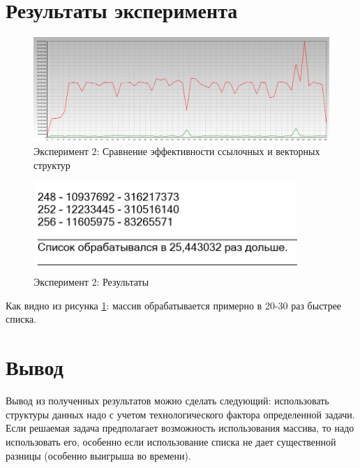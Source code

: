 \section{Результаты эксперимента}
\begin{figure}[ht!]
    \centering
    \includegraphics[width=170mm]{./img/task_02.png}
    \caption{Эксперимент 2: Сравнение эффективности ссылочных и векторных структур}
\end{figure}

\begin{figure}[ht!]
    \centering
    \includegraphics[width=100mm]{./img/res_02.png}
    \caption{Эксперимент 2: Результаты\label{res_02}}
\end{figure}

Как видно из рисунка \ref{res_02}: массив обрабатывается примерно в 20-30 раз быстрее списка.

\section{Вывод}
Вывод из полученных результатов можно сделать следующий: использовать структуры данных надо с учетом технологического фактора
определенной задачи. Если решаемая задача предполагает возможность использования массива, то надо использовать его, особенно если использование списка не дает существенной разницы (особенно выигрыша во времени).

